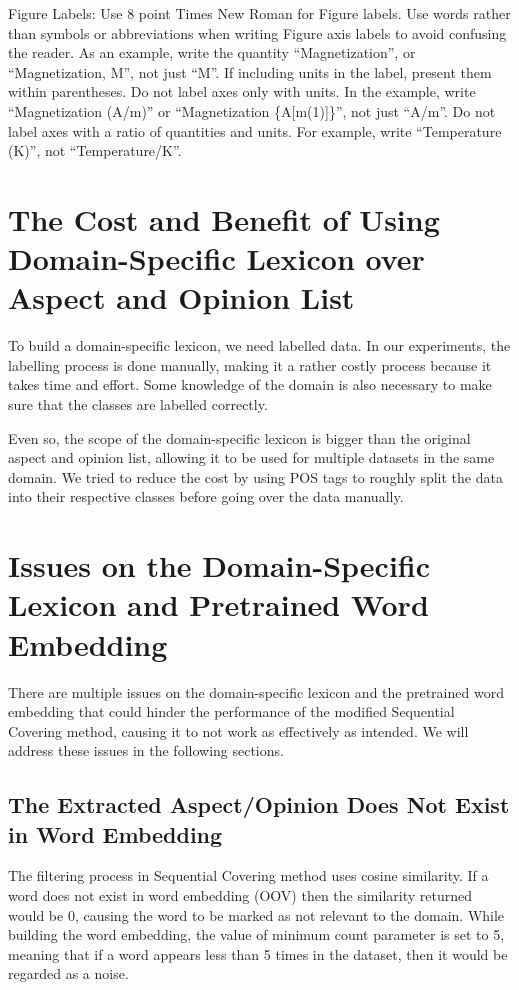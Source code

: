 \documentclass[a4paper,conference]{IEEEtran}
\begin{document}
Figure Labels: Use 8 point Times New Roman for Figure labels. Use words 
rather than symbols or abbreviations when writing Figure axis labels to 
avoid confusing the reader. As an example, write the quantity 
``Magnetization'', or ``Magnetization, M'', not just ``M''. If including 
units in the label, present them within parentheses. Do not label axes only 
with units. In the example, write ``Magnetization (A/m)'' or ``Magnetization 
\{A[m(1)]\}'', not just ``A/m''. Do not label axes with a ratio of 
quantities and units. For example, write ``Temperature (K)'', not 
``Temperature/K''.

\section{The Cost and Benefit of Using Domain-Specific Lexicon over Aspect and Opinion List}
To build a domain-specific lexicon, we need labelled data. In our experiments, the labelling process is done manually, making it a rather costly process because it takes time and effort. Some knowledge of the domain is also necessary to make sure that the classes are labelled correctly.

Even so, the scope of the domain-specific lexicon is bigger than the original aspect and opinion list, allowing it to be used for multiple datasets in the same domain. We tried to reduce the cost by using POS tags to roughly split the data into their respective classes before going over the data manually.

\section{Issues on the Domain-Specific Lexicon and Pretrained Word Embedding}
There are multiple issues on the domain-specific lexicon and the pretrained word embedding that could hinder the performance of the modified Sequential Covering method, causing it to not work as effectively as intended. We will address these issues in the following sections.

\subsection{The Extracted Aspect/Opinion Does Not Exist in Word Embedding}
The filtering process in Sequential Covering method uses cosine similarity. If a word does not exist in word embedding (OOV) then the similarity returned would be 0, causing the word to be marked as not relevant to the domain. While building the word embedding, the value of minimum count parameter is set to 5, meaning that if a word appears less than 5 times in the dataset, then it would be regarded as a noise.
\end{document}
